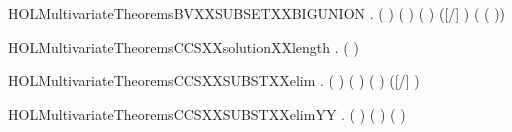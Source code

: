\begin{SaveVerbatim}{HOLMultivariateTheoremsBVXXSUBSETXXBIGUNION}
\HOLTokenTurnstile{} \HOLSymConst{\HOLTokenForall{}}  .
         \HOLSymConst{\HOLTokenConj{}} (  \HOLSymConst{=}  ) \HOLSymConst{\HOLTokenConj{}}
        ( ) ( ) \HOLSymConst{\HOLTokenImp{}}
        ([/] ) \HOLConst{\HOLTokenSubset{}}   \HOLConst{\HOLTokenUnion{}}  (  ( ))
\end{SaveVerbatim}
\newcommand{\HOLMultivariateTheoremsBVXXSUBSETXXBIGUNION}{\UseVerbatim{HOLMultivariateTheoremsBVXXSUBSETXXBIGUNION}}
\begin{SaveVerbatim}{HOLMultivariateTheoremsCCSXXsolutionXXlength}
\HOLTokenTurnstile{} \HOLSymConst{\HOLTokenForall{}}   .
          \HOLSymConst{\HOLTokenConj{}}      \HOLSymConst{\HOLTokenImp{}}
       (  \HOLSymConst{=}  )
\end{SaveVerbatim}
\newcommand{\HOLMultivariateTheoremsCCSXXsolutionXXlength}{\UseVerbatim{HOLMultivariateTheoremsCCSXXsolutionXXlength}}
\begin{SaveVerbatim}{HOLMultivariateTheoremsCCSXXSUBSTXXelim}
\HOLTokenTurnstile{} \HOLSymConst{\HOLTokenForall{}}  .
        ( ) ( ) \HOLSymConst{\HOLTokenConj{}} (  \HOLSymConst{=}  ) \HOLSymConst{\HOLTokenImp{}}
       ([/]  \HOLSymConst{=} )
\end{SaveVerbatim}
\newcommand{\HOLMultivariateTheoremsCCSXXSUBSTXXelim}{\UseVerbatim{HOLMultivariateTheoremsCCSXXSUBSTXXelim}}
\begin{SaveVerbatim}{HOLMultivariateTheoremsCCSXXSUBSTXXelimYY}
\HOLTokenTurnstile{} \HOLSymConst{\HOLTokenForall{}} .  ( ) ( ) \HOLSymConst{\HOLTokenImp{}} (   \HOLSymConst{=} )
\end{SaveVerbatim}
